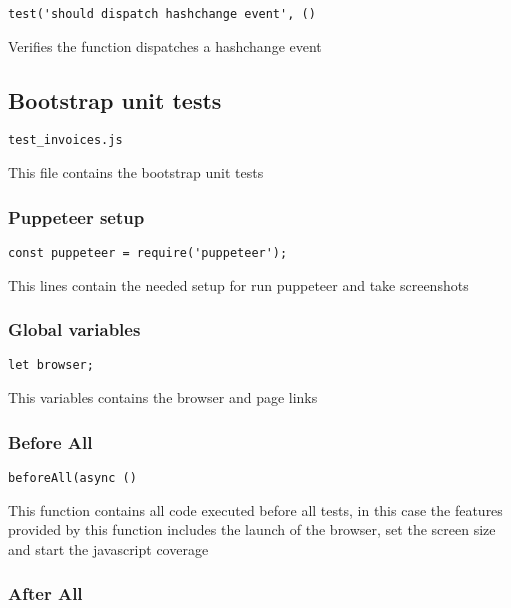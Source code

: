 \documentclass[a4paper]{article}
\begin{document}
\begin{lstlisting}
test('should dispatch hashchange event', ()
\end{lstlisting}

Verifies the function dispatches a hashchange event

\hypertarget{toc657}{}
\subsection{Bootstrap unit tests}

\begin{lstlisting}
test_invoices.js
\end{lstlisting}

This file contains the bootstrap unit tests

\hypertarget{toc658}{}
\subsubsection{Puppeteer setup}

\begin{lstlisting}
const puppeteer = require('puppeteer');
\end{lstlisting}

This lines contain the needed setup for run puppeteer and take screenshots

\hypertarget{toc659}{}
\subsubsection{Global variables}

\begin{lstlisting}
let browser;
\end{lstlisting}

This variables contains the browser and page links

\hypertarget{toc660}{}
\subsubsection{Before All}

\begin{lstlisting}
beforeAll(async ()
\end{lstlisting}

This function contains all code executed before all tests, in this case the
features provided by this function includes the launch of the browser, set
the screen size and start the javascript coverage

\hypertarget{toc661}{}
\subsubsection{After All}
\end{document}

